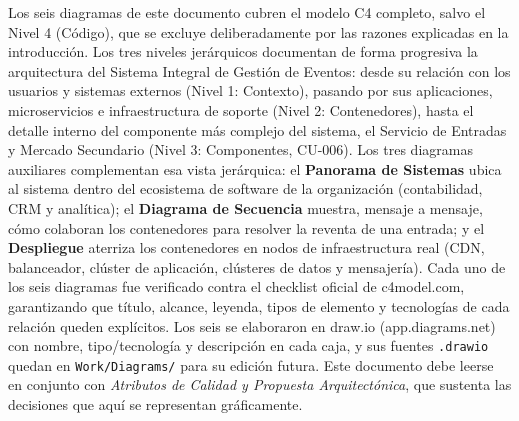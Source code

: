 \documentclass[12pt,a4paper]{article}
\begin{document}
Los seis diagramas de este documento cubren el modelo C4 completo, salvo el Nivel 4 (Código), que
se excluye deliberadamente por las razones explicadas en la introducción. Los tres niveles
jerárquicos documentan de forma progresiva la arquitectura del Sistema Integral de Gestión de
Eventos: desde su relación con los usuarios y sistemas externos (Nivel 1: Contexto), pasando por
sus aplicaciones, microservicios e infraestructura de soporte (Nivel 2: Contenedores), hasta el
detalle interno del componente más complejo del sistema, el Servicio de Entradas y Mercado
Secundario (Nivel 3: Componentes, CU-006). Los tres diagramas auxiliares complementan esa vista
jerárquica: el \textbf{Panorama de Sistemas} ubica al sistema dentro del ecosistema de software de
la organización (contabilidad, CRM y analítica); el \textbf{Diagrama de Secuencia} muestra, mensaje
a mensaje, cómo colaboran los contenedores para resolver la reventa de una entrada; y el
\textbf{Despliegue} aterriza los contenedores en nodos de infraestructura real (CDN, balanceador,
clúster de aplicación, clústeres de datos y mensajería). Cada uno de los seis diagramas fue
verificado contra el checklist oficial de c4model.com, garantizando que título, alcance, leyenda,
tipos de elemento y tecnologías de cada relación queden explícitos. Los seis se elaboraron en
draw.io (app.diagrams.net) con nombre, tipo/tecnología y descripción en cada caja, y sus fuentes
\texttt{.drawio} quedan en \texttt{Work/Diagrams/} para su edición futura. Este documento debe
leerse en conjunto con \textit{Atributos de Calidad y Propuesta Arquitectónica}, que sustenta las
decisiones que aquí se representan gráficamente.
\end{document}
